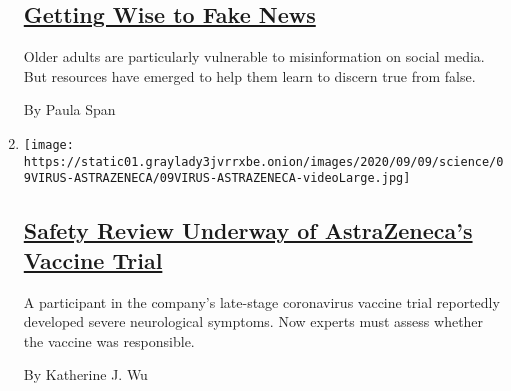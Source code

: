 \begin{enumerate}
  \hypertarget{getting-wise-to-fake-news}{%
  \subsection{\texorpdfstring{\href{/2020/09/11/health/misinformation-social-media-elderly.html}{Getting
  Wise to Fake
  News}}{Getting Wise to Fake News}}\label{getting-wise-to-fake-news}}

  Older adults are particularly vulnerable to misinformation on social
  media. But resources have emerged to help them learn to discern true
  from false.

  By Paula Span
\item
  \texttt{[image: https://static01.graylady3jvrrxbe.onion/images/2020/09/09/science/09VIRUS-ASTRAZENECA/09VIRUS-ASTRAZENECA-videoLarge.jpg]}

  \hypertarget{safety-review-underway-of-astrazenecas-vaccine-trial}{%
  \subsection{\texorpdfstring{\href{/2020/09/10/health/covid-astrazeneca-vaccine-trans.html}{Safety
  Review Underway of AstraZeneca's Vaccine
  Trial}}{Safety Review Underway of AstraZeneca's Vaccine Trial}}\label{safety-review-underway-of-astrazenecas-vaccine-trial}}

  A participant in the company's late-stage coronavirus vaccine trial
  reportedly developed severe neurological symptoms. Now experts must
  assess whether the vaccine was responsible.

  By Katherine J. Wu
\end{enumerate}

